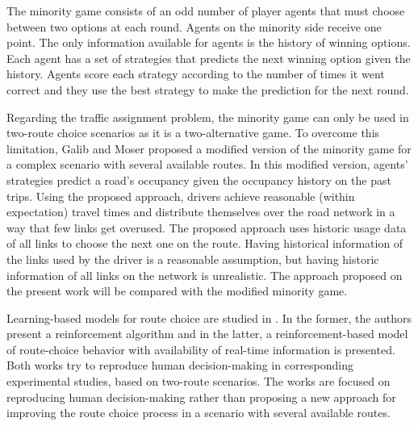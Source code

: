 \documentclass{RITA}
\begin{document}
The minority game consists of an odd number of player agents that must choose between two options at each round. Agents on the minority side receive one point. The only information available for agents is the history of winning options. Each agent has a set of strategies that predicts the next winning option given the history. Agents score each strategy according to the number of times it went correct and they use the best strategy to make the prediction for the next round.

Regarding the traffic assignment problem, the minority game can only be used in two-route choice scenarios as it is a two-alternative game. To overcome this limitation, Galib and Moser \cite{Galib&Moser2011} proposed a modified version of the minority game for a complex scenario with several available routes. In this modified version, agents' strategies predict a road's occupancy given the occupancy history on the past trips. Using the proposed approach, drivers achieve reasonable (within expectation) travel times and distribute themselves over the road network in a way that few links get overused. The proposed approach uses historic usage data of all links to choose the next one on the route. Having historical information of the links used by the driver is a reasonable assumption, but having historic information of all links on the network is unrealistic. The approach proposed on the present work will be compared with the modified minority game. 


Learning-based models for route choice are studied in \cite{Chmura&Pitz2007,Ben-Elia&Shiftan2010}. In the former, the authors present a reinforcement algorithm and in the latter, a reinforcement-based model of route-choice behavior with availability of real-time information is presented. Both works try to reproduce human decision-making in corresponding experimental studies, based on two-route scenarios. The works are focused on reproducing human decision-making rather than proposing a new approach for improving the route choice process in a scenario with several available routes.
\end{document}

